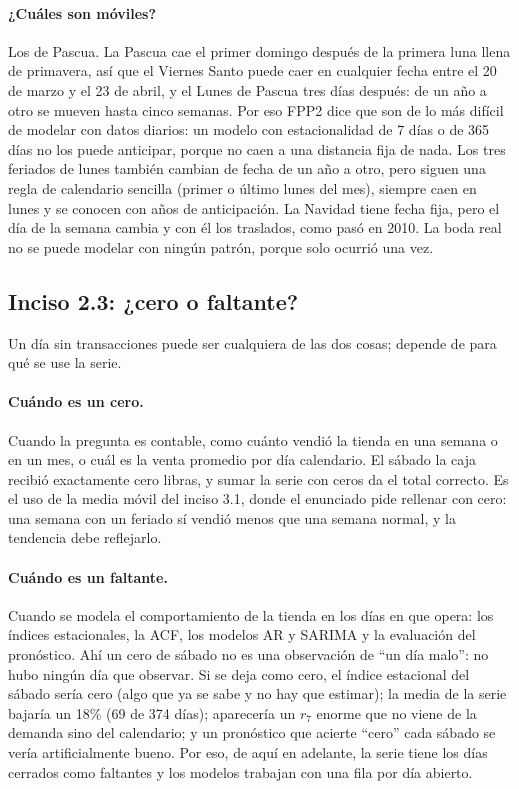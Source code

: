 \paragraph{¿Cuáles son móviles?} Los de Pascua. La Pascua cae el primer
domingo después de la primera luna llena de primavera, así que el Viernes
Santo puede caer en cualquier fecha entre el 20 de marzo y el 23 de abril, y
el Lunes de Pascua tres días después: de un año a otro se mueven hasta cinco
semanas. Por eso
FPP2 dice que son de lo más difícil de modelar con datos diarios: un modelo
con estacionalidad de 7 días o de 365 días no los puede anticipar, porque no
caen a una distancia fija de nada. Los tres feriados de lunes también cambian
de fecha de un año a otro, pero siguen una regla de calendario sencilla
(primer o último lunes del mes), siempre caen en lunes y se conocen con años de
anticipación. La Navidad tiene fecha fija, pero el día de la semana cambia y
con él los traslados, como pasó en 2010. La boda real no se puede modelar con
ningún patrón, porque solo ocurrió una vez.

\subsection{Inciso 2.3: ¿cero o faltante?}

Un día sin transacciones puede ser cualquiera de las dos cosas; depende de
para qué se use la serie.

\paragraph{Cuándo es un cero.} Cuando la pregunta es contable, como cuánto
vendió la tienda en una semana o en un mes, o cuál es la venta promedio por
día calendario. El sábado la caja recibió exactamente cero libras, y sumar la
serie con ceros da el total correcto. Es el uso de la media móvil del inciso
3.1, donde el enunciado pide rellenar con cero: una semana con un feriado sí
vendió menos que una semana normal, y la tendencia debe reflejarlo.

\paragraph{Cuándo es un faltante.} Cuando se modela el comportamiento de la
tienda en los días en que opera: los índices estacionales, la ACF, los
modelos AR y SARIMA y la evaluación del pronóstico. Ahí un cero de sábado no
es una observación de ``un día malo'': no hubo ningún día que observar. Si se
deja como cero, el índice estacional del sábado sería cero (algo que ya se
sabe y no hay que estimar); la media de la serie bajaría un 18\% (69 de 374 días);
aparecería un $r_7$ enorme que no viene de la demanda sino del calendario; y
un pronóstico que acierte ``cero'' cada sábado se vería artificialmente bueno.
Por eso, de aquí en adelante, la serie tiene los días cerrados como faltantes
y los modelos trabajan con una fila por día abierto.

